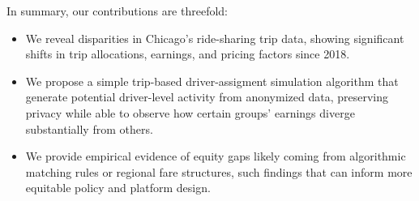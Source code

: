 %
In summary, our contributions are threefold:
\begin{itemize}
\item We reveal disparities in Chicago’s ride-sharing trip data, showing significant shifts in trip allocations, earnings, and pricing factors since 2018.
\item 
We propose a simple trip-based driver-assigment simulation algorithm that generate potential driver-level activity from anonymized data, preserving privacy while able to observe how certain groups’ earnings diverge substantially from others.
\item 
We provide empirical evidence of equity gaps likely coming from algorithmic matching rules or regional fare structures, such findings that can inform more equitable policy and platform design.
\end{itemize}

